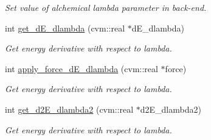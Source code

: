 \begin{DoxyCompactItemize}
\begin{DoxyCompactList}\small\item\em Set value of alchemical lambda parameter in back-\/end. \end{DoxyCompactList}\item 
int \hyperlink{classcolvarproxy__tinkerhp_a09fa23027d00551790910f4b482e0296}{get\-\_\-d\-E\-\_\-dlambda} (cvm\-::real $\ast$d\-E\-\_\-dlambda)
\begin{DoxyCompactList}\small\item\em Get energy derivative with respect to lambda. \end{DoxyCompactList}\item 
int \hyperlink{classcolvarproxy__tinkerhp_ae56d9c40717b6d4669230adc9260b9ac}{apply\-\_\-force\-\_\-d\-E\-\_\-dlambda} (cvm\-::real $\ast$force)
\begin{DoxyCompactList}\small\item\em Get energy derivative with respect to lambda. \end{DoxyCompactList}\item 
int \hyperlink{classcolvarproxy__tinkerhp_a6ec771bb6f0ce3b0f48b04e68509864a}{get\-\_\-d2\-E\-\_\-dlambda2} (cvm\-::real $\ast$d2\-E\-\_\-dlambda2)
\begin{DoxyCompactList}\small\item\em Get energy derivative with respect to lambda. \end{DoxyCompactList}\end{DoxyCompactItemize}
